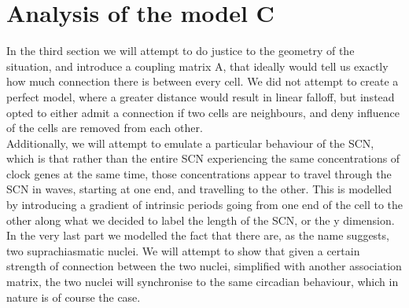     \section{Analysis of the model C} 
    In the third section we will attempt to do justice to the geometry of the situation, and introduce a coupling matrix A, that ideally would tell us exactly how much connection there is between every cell. We did not attempt to create a perfect model, where a greater distance would result in linear falloff, but instead opted to either admit a connection if two cells are neighbours, and deny influence of the cells are removed from each other. \\
    
    Additionally, we will attempt to emulate a particular behaviour of the SCN, which is that rather than the entire SCN experiencing the same concentrations of clock genes at the same time, those concentrations appear to travel through the SCN in waves, starting at one end, and travelling to the other. This is modelled by introducing a gradient of intrinsic periods going from one end of the cell to the other along what we decided to label the length of the SCN, or the y dimension. \\
    
    In the very last part we modelled the fact that there are, as the name suggests, two suprachiasmatic nuclei. We will attempt to show that given a certain strength of connection between the two nuclei, simplified with another association matrix, the two nuclei will synchronise to the same circadian behaviour, which in nature is of course the case.
    
    
